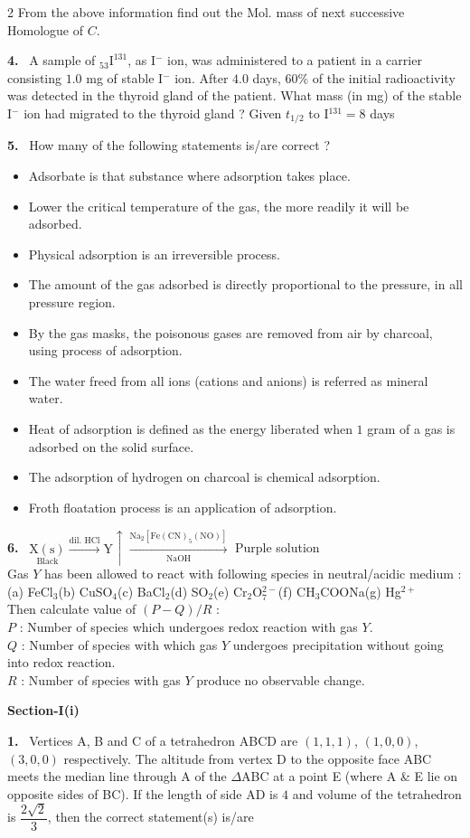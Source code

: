 \documentclass[10pt]{extarticle}
\newcommand{\partsec}[2]{\par\medskip\noindent{\large\bfseries PART-#1: #2}\par\smallskip}
\newcommand{\sect}[1]{\par\smallskip\noindent\textbf{#1}\par}
\newcommand{\qn}[1]{\par\smallskip\noindent\textbf{#1.}~}
\newenvironment{qoptions}{\begin{itemize}[leftmargin=1.8em,itemsep=1pt,topsep=2pt,label={}]}{\end{itemize}}
\newcommand{\opt}[2]{\item[(#1)] #2}
\begin{document}
\begin{multicols}{2}
From the above information find out the Mol. mass of next successive Homologue of $C$.
\qn{4} A sample of $_{53}\mathrm{I}^{131}$, as I$^-$ ion, was administered to a patient in a carrier consisting $1.0$ mg of stable I$^-$ ion. After $4.0$ days, $60\%$ of the initial radioactivity was detected in the thyroid gland of the patient. What mass (in mg) of the stable I$^-$ ion had migrated to the thyroid gland ? Given $t_{1/2}$ to I$^{131}=8$ days
\qn{5} How many of the following statements is/are correct ?
\begin{qoptions}
\opt{1.}{Adsorbate is that substance where adsorption takes place.}
\opt{2.}{Lower the critical temperature of the gas, the more readily it will be adsorbed.}
\opt{3.}{Physical adsorption is an irreversible process.}
\opt{4.}{The amount of the gas adsorbed is directly proportional to the pressure, in all pressure region.}
\opt{5.}{By the gas masks, the poisonous gases are removed from air by charcoal, using process of adsorption.}
\opt{6.}{The water freed from all ions (cations and anions) is referred as mineral water.}
\opt{7.}{Heat of adsorption is defined as the energy liberated when $1$ gram of a gas is adsorbed on the solid surface.}
\opt{8.}{The adsorption of hydrogen on charcoal is chemical adsorption.}
\opt{9.}{Froth floatation process is an application of adsorption.}
\end{qoptions}
\qn{6} $\underset{\text{Black}}{\mathrm{X(s)}}\xrightarrow{\text{dil. HCl}}\mathrm{Y}\!\uparrow\xrightarrow[\text{NaOH}]{\mathrm{Na_2[Fe(CN)_5(NO)]}}$ Purple solution\\
Gas $Y$ has been allowed to react with following species in neutral/acidic medium :\\
(a) FeCl$_3$\quad (b) CuSO$_4$\quad (c) BaCl$_2$\quad (d) SO$_2$\quad (e) Cr$_2$O$_7^{2-}$\quad (f) CH$_3$COONa\quad (g) Hg$^{2+}$\\
Then calculate value of $(P-Q)/R$ :\\
$P$ : Number of species which undergoes redox reaction with gas $Y$.\\
$Q$ : Number of species with which gas $Y$ undergoes precipitation without going into redox reaction.\\
$R$ : Number of species with gas $Y$ produce no observable change.
\partsec{3}{MATHEMATICS}
\sect{Section-I(i)}
\qn{1} Vertices A, B and C of a tetrahedron ABCD are $(1,1,1)$, $(1,0,0)$, $(3,0,0)$ respectively. The altitude from vertex D to the opposite face ABC meets the median line through A of the $\Delta$ABC at a point E (where A \& E lie on opposite sides of BC). If the length of side AD is $4$ and volume of the tetrahedron is $\dfrac{2\sqrt2}{3}$, then the correct statement(s) is/are

\end{multicols}
\end{document}
